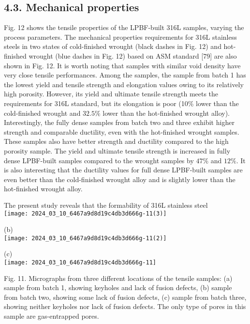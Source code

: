 \documentclass[10pt]{article}
\begin{document}
\subsection*{4.3. Mechanical properties}
Fig. 12 shows the tensile properties of the LPBF-built 316L samples, varying the process parameters. The mechanical properties requirements for 316L stainless steels in two states of cold-finished wrought (black dashes in Fig. 12) and hot-finished wrought (blue dashes in Fig. 12) based on ASM standard [79] are also shown in Fig. 12. It is worth noting that samples with similar void density have very close tensile performances. Among the samples, the sample from batch 1 has the lowest yield and tensile strength and elongation values owing to its relatively high porosity. However, its yield and ultimate tensile strength meets the requirements for 316L standard, but its elongation is poor (10\% lower than the cold-finished wrought and $32.5 \%$ lower than the hot-finished wrought alloy). Interestingly, the fully dense samples from batch two and three exhibit higher strength and comparable ductility, even with the hot-finished wrought samples. These samples also have better strength and ductility compared to the high porosity sample. The yield and ultimate tensile strength is increased in fully dense LPBF-built samples compared to the wrought samples by $47 \%$ and $12 \%$. It is also interesting that the ductility values for full dense LPBF-built samples are even better than the cold-finished wrought alloy and is slightly lower than the hot-finished wrought alloy.

The present study reveals that the formability of 316L stainless steel\\
\texttt{[image: 2024\_03\_10\_6467a9d8d19c4db3d666g-11(3)]}

(b)\\
\texttt{[image: 2024\_03\_10\_6467a9d8d19c4db3d666g-11(2)]}

(c)\\
\texttt{[image: 2024\_03\_10\_6467a9d8d19c4db3d666g-11]}

Fig. 11. Micrographs from three different locations of the tensile samples: (a) sample from batch 1, showing keyholes and lack of fusion defects, (b) sample from batch two, showing some lack of fusion defects, (c) sample from batch three, showing neither keyholes nor lack of fusion defects. The only type of pores in this sample are gas-entrapped pores.
\end{document}
